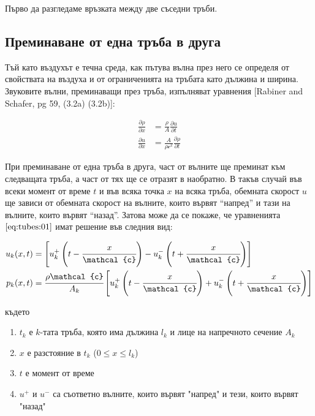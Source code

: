 \documentclass[12pt]{report}
\numberwithin{equation}{section}
\numberwithin{figure}{section}
\newcommand{\B}[1]{\left(#1\right)}
\newcommand{\Q}[1]{\left[#1\right]}
\begin{document}
    Първо да разгледаме връзката между две съседни тръби.
    
    \subsection{Преминаване от една тръба в друга}

    Тъй като въздухът е течна среда, как пътува вълна през него се определя от свойствата на въздуха и от ограниченията на тръбата като дължина и ширина. Звуковите вълни, преминаващи през
    тръба, изпълняват уравнения [Rabiner and Schafer, pg 59, (3.2a) (3.2b)]:
    
    \begin{subequations}
        \label{eq:tubes:01}
        \begin{align}
            \label{eq:tubes:01:a} \frac{\partial\rho}{\partial x} & = \frac{\rho}{A} \frac{\partial u}{\partial t}\\
            \label{eq:tubes:01:b} \frac{\partial u}{\partial x} & = \frac{A}{\rho \mathcal{c}^2} \frac{\partial \rho}{\partial t}
        \end{align}
    \end{subequations}

    При преминаване от една тръба в друга, част от вълните ще преминат към следващата тръба, а част от тях ще се отразят в наобратно.
    В такъв случай във всеки момент от време $t$ и във всяка точка $x$ на всяка тръба,
    обемната скорост $u$ ще зависи от обемната скорост на вълните,
    които вървят ``напред'' и тази на вълните, които вървят ``назад''.
    Затова може да се покаже, че уравненията $\eqref{eq:tubes:01}$ имат решение във следния вид:

    \begin{subequations}
        \label{eq:tubes:02}
        \begin{align}
            u_{k}(x, t) & = \Q{u_{k}^{+}\B{t - \cfrac{x}{\mathcal{c}}} - u_{k}^{-}\B{t + \cfrac{x}{\mathcal{c}}}}\\
            p_{k}(x, t) & = \cfrac{\rho \mathcal{c}}{A_{k}} \Q{u_{k}^{+}\B{t - \cfrac{x}{\mathcal{c}}} + u_{k}^{-}\B{t + \cfrac{x}{\mathcal{c}}}}
        \end{align}
    \end{subequations}

    където 
    \begin{enumerate}
        \item{$t_{k}$} е $k$-тата тръба, която има дължина $l_k$ и лице на напречното сечение $A_k$
        \item{$x$} е разстояние в $t_k$ ($0\leq x \leq l_k$)
        \item{$t$} е момент от време
        \item{$u^{+}$ и $u^{-}$} са съответно вълните, които вървят "напред" и тези, които вървят "назад"
    \end{enumerate}
\end{document}
